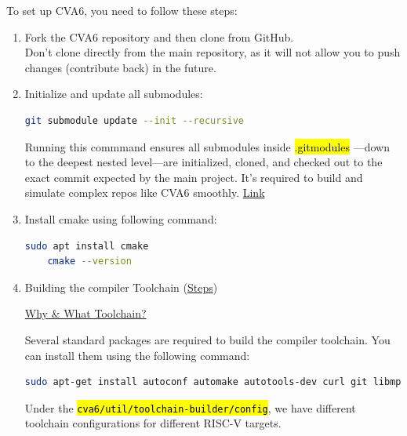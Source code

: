 \documentclass[12pt, a4paper]{article}
\begin{document}
To set up CVA6, you need to follow these steps:
\begin{enumerate}
    \item Fork the CVA6 repository and then clone from GitHub. \\
    Don't clone directly from the main repository, as it will not allow you to push changes (contribute back) in the future.

    \item Initialize and update all submodules:

        \begin{lstlisting}[language=bash, frame=single, basicstyle=\ttfamily\footnotesize]
    git submodule update --init --recursive
        \end{lstlisting}

        Running this commmand ensures all submodules inside \hl{.gitmodules} —down to the deepest nested level—are initialized, cloned, and checked out to the exact commit expected by the main project. It's required to build and simulate complex repos like CVA6 smoothly. \href{https://chatgpt.com/s/t_6859c638d5208191bfd8707c9580f31a}{Link}
    
    \item Install cmake using following command:

        \begin{lstlisting}[language=bash, frame=single, basicstyle=\ttfamily\footnotesize]
    sudo apt install cmake
    cmake --version
        \end{lstlisting}

    \item Building the compiler Toolchain (\href{https://chatgpt.com/s/t_685e68ba0bfc81918b7b5a289666f145}{Steps})
        
        \href{https://chatgpt.com/s/t_685e51d3aca08191a9d3c16adf555498}{Why \& What Toolchain?} 

        Several standard packages are required to build the compiler toolchain. You can install them using the following command:

        \begin{lstlisting}[language=bash, frame=single, basicstyle=\ttfamily\footnotesize]
    sudo apt-get install autoconf automake autotools-dev curl git libmpc-dev libmpfr-dev libgmp-dev gawk build-essential bison flex texinfo gperf libtool bc zlib1g-dev
        \end{lstlisting}

        Under the \hl{\texttt{cva6/util/toolchain-builder/config}}, we have different toolchain configurations for different RISC-V targets.


\end{enumerate}
\end{document}
